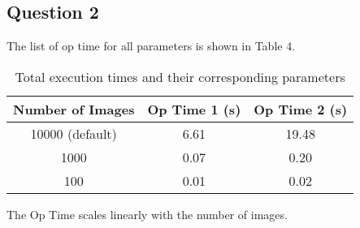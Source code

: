 \documentclass[12pt,titlepage]{article}
\begin{document}
\subsection*{Question 2}

The list of op time for all parameters is shown in Table 4.

\begin{table}[h!]
	\centering
	\begin{tabular}{||c | c | c ||}
		\hline
		Number of Images & Op Time 1 (s) & Op Time 2 (s) \\ [0.5ex]
		\hline\hline
		10000 (default)  & 6.61          & 19.48         \\
		1000             & 0.07          &  0.20         \\
		100              & 0.01          &  0.02         \\
		\hline\hline
	\end{tabular}
	\caption{Total execution times and their corresponding parameters}
\end{table}

The Op Time scales linearly with the number of images.
\end{document}
